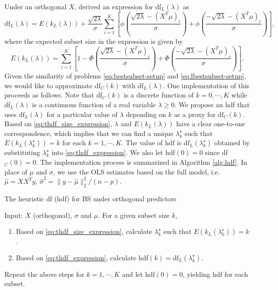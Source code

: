 Under an orthogonal $X$, \citet{Tibshirani2015} derived an expression for df$_L(\lambda)$ as 
\begin{equation}
	\text{df}_L(\lambda) = E(k_L(\lambda)) + \frac{\sqrt{2\lambda}}{\sigma} \sum_{i=1}^{K} \left[\phi\left(\frac{\sqrt{2\lambda}-(X^T \mu)_i}{\sigma}\right) + \phi\left(\frac{-\sqrt{2\lambda}-(X^T \mu)_i}{\sigma}\right) \right],
	\label{eq:thdf_expression}
\end{equation}
where the expected subset size in the expression is given by 
\begin{equation}
	E(k_L(\lambda)) = \sum_{i=1}^{K} \left[1-\Phi\left(\frac{\sqrt{2\lambda}-(X^T \mu)_i}{\sigma}\right) + \Phi\left(\frac{-\sqrt{2\lambda}-(X^T \mu)_i}{\sigma}\right) \right].
	\label{eq:thdf_size_expression}
\end{equation}
Given the similarity of problems \eqref{eq:bestsubset-setup} and \eqref{eq:lbestsubset-setup}, we would like to approximate df$_C(k)$ with df$_L(\lambda)$. One implementation of this proceeds as follows. Note that df$_C(k)$ is a discrete function of $k=0,\cdots,K$ while df$_L(\lambda)$ is a continuous function of a real variable $\lambda\ge 0$. We propose an hdf that uses $\text{df}_L(\lambda)$ for a particular value of $\lambda$ depending on $k$ as a proxy for $\text{df}_C(k)$. Based on \eqref{eq:thdf_size_expression}, $\lambda$ and $E(k_L(\lambda))$ have a clear one-to-one correspondence, which implies that we can find a unique $\lambda_k^\star$ such that $E(k_L(\lambda_k^\star)) = k$ for each $k=1,\cdots,K$. The value of hdf is df$_L(\lambda_k^\star)$ obtained by substituting $\lambda^\star_k$ into \eqref{eq:thdf_expression}. We also let hdf$(0)=0$ since df$_C(0)=0$. The implementation process is summarized in Algorithm \ref{alg:hdf}. In place of $\mu$ and $\sigma$, we use the OLS estimates based on the full model, i.e. $\hat{\mu}=XX^T y$, $\hat{\sigma}^2 = \lVert y-\hat{\mu} \rVert_2^2/(n-p)$.

\begin{algorithm}
	\caption{The heuristic df (hdf) for BS under orthogonal predictors}\label{alg:hdf}
	Input: $X$ (orthogonal), $\sigma$ and $\mu$. For a given subset size $k$, 
	\begin{enumerate}[label=\arabic*.]
		\item Based on \eqref{eq:thdf_size_expression}, calculate $\lambda_k^\star$ such that $E(k_L(\lambda_k^\star)) = k$.
		\item Based on \eqref{eq:thdf_expression}, calculate hdf$(k) = \text{df}_L(\lambda_k^\star)$.
	\end{enumerate}
	Repeat the above steps for $k=1,\cdots,K$ and let hdf$(0)=0$, yielding hdf for each subset. 
	
\end{algorithm}


